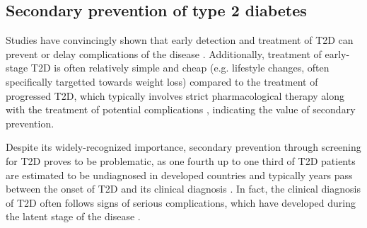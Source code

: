 \subsection{Secondary prevention of type 2 diabetes} \label{intro:screening}
Studies have convincingly shown that early detection and treatment of T2D can prevent or delay complications of the disease \citep{haffner1990cardiovascular,engelgau2000screening, genuth2003implications, holman200810, gaede2008effect, echouffo2011screening}. Additionally, treatment of early-stage T2D is often relatively simple and cheap (e.g. lifestyle changes, often specifically targetted towards weight loss) compared to the treatment of progressed T2D, which typically involves strict pharmacological therapy along with the treatment of potential complications \citep{pan1997effects,tuomilehto2001prevention,diabetes2002reduction,zammitt2005hypoglycemia}, indicating the value of secondary prevention.

Despite its widely-recognized importance, secondary prevention through screening for T2D proves to be problematic, as one fourth up to one third of T2D patients are estimated to be undiagnosed in developed countries \citep{diabetesliga, beagley2014global, american2014standards} and typically years pass between the onset of T2D and its clinical diagnosis \citep{harris1992onset}. In fact, the clinical diagnosis of T2D often follows signs of serious complications, which have developed during the latent stage of the disease \citep{rajala1998prevalence,harris2000early, hu2002elevated, american2014standards}. 

